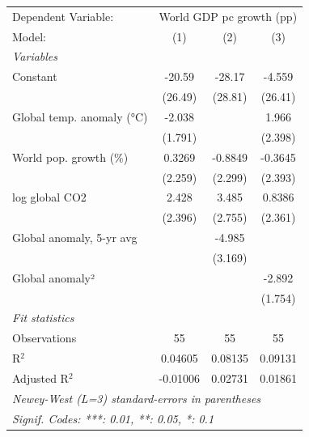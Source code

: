 
\begingroup
\centering
\begin{tabular}{lccc}
   \tabularnewline \midrule \midrule
   Dependent Variable: & \multicolumn{3}{c}{World GDP pc growth (pp)}\\
   Model:                    & (1)      & (2)     & (3)\\  
   \midrule
   \emph{Variables}\\
   Constant                  & -20.59   & -28.17  & -4.559\\   
                             & (26.49)  & (28.81) & (26.41)\\   
   Global temp. anomaly (°C) & -2.038   &         & 1.966\\   
                             & (1.791)  &         & (2.398)\\   
   World pop. growth (\%)    & 0.3269   & -0.8849 & -0.3645\\   
                             & (2.259)  & (2.299) & (2.393)\\   
   log global CO2            & 2.428    & 3.485   & 0.8386\\   
                             & (2.396)  & (2.755) & (2.361)\\   
   Global anomaly, 5-yr avg  &          & -4.985  &   \\   
                             &          & (3.169) &   \\   
   Global anomaly²           &          &         & -2.892\\   
                             &          &         & (1.754)\\   
   \midrule
   \emph{Fit statistics}\\
   Observations              & 55       & 55      & 55\\  
   R$^2$                     & 0.04605  & 0.08135 & 0.09131\\  
   Adjusted R$^2$            & -0.01006 & 0.02731 & 0.01861\\  
   \midrule \midrule
   \multicolumn{4}{l}{\emph{Newey-West (L=3) standard-errors in parentheses}}\\
   \multicolumn{4}{l}{\emph{Signif. Codes: ***: 0.01, **: 0.05, *: 0.1}}\\
\end{tabular}
\par\endgroup


